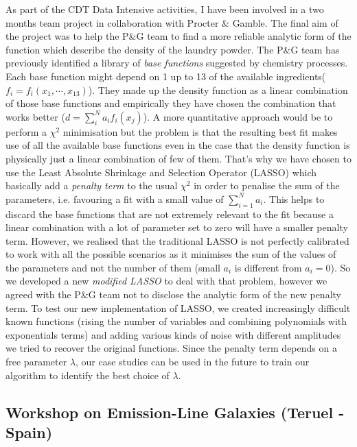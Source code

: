 \documentclass[letterpaper]{article}
\newcommand{\peg}{P$\&$G }
\begin{document}
As part of the CDT Data Intensive activities, I have been involved in a two months team project in collaboration with Procter $\&$ Gamble. The final aim of the project was to help the P$\&$G team to find a more reliable analytic form of the function which describe the density of the laundry powder. The \peg team has previously identified a library of \textit{base functions} suggested by chemistry processes. Each base function might depend on 1 up to 13 of the available ingredients($f_i = f_i(x_1, \cdots, x_{13})$). They made up the density function as a linear combination of those base functions and empirically they have chosen the combination that works better ($d = \sum_i^N a_i f_i(x_j)$). A more quantitative approach would be to perform a $\chi^2$ minimisation but the problem is that the resulting best fit makes use of all the available base functions even in the case that the density function is physically just a linear combination of few of them. That's why we have chosen to use the Least Absolute Shrinkage and Selection Operator (LASSO) which basically add a \textit{penalty term} to the usual $\chi^2$ in order to penalise the sum of the parameters, i.e. favouring a fit with a small value of $\sum_{i=1}^N a_i$. This helps to discard the base functions that are not extremely relevant to the fit because a linear combination with a lot of parameter set to zero will have a smaller penalty term. However, we realised that the traditional LASSO is not perfectly calibrated to work with all the possible scenarios as it minimises the sum of the values of the parameters and not the number of them (small $a_i$ is different from $a_i=0$). So we developed a new \textit{modified LASSO} to deal with that problem, however we agreed with the \peg team not to disclose the analytic form of the new penalty term. To test our new implementation of LASSO, we created increasingly difficult known functions (rising the number of variables and combining polynomials with exponentials terms) and adding various kinds of noise with different amplitudes we tried to recover the original functions. Since the penalty term depends on a free parameter $\lambda$, our case studies can be used in the future to train our algorithm to identify the best choice of $\lambda$.

\subsection{Workshop on Emission-Line Galaxies (Teruel - Spain) }
\label{sub:teruel}
\end{document}
